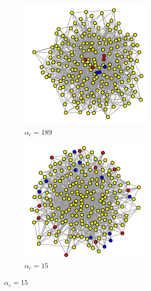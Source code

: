 \begin{figure}[H]
  \begin{subfigure}{0.38\textwidth}
    \centering
    \includegraphics[width=\linewidth]{Graphs/phi189_network.png}
    \caption{\(\alpha_c=189\)}
  \end{subfigure}\hfill
  \begin{subfigure}{0.38\textwidth}
    \centering
    \includegraphics[width=\linewidth]{Graphs/phi15_network.png}
    \caption{\(\alpha_c=15\)}
  \end{subfigure}


\end{figure}
